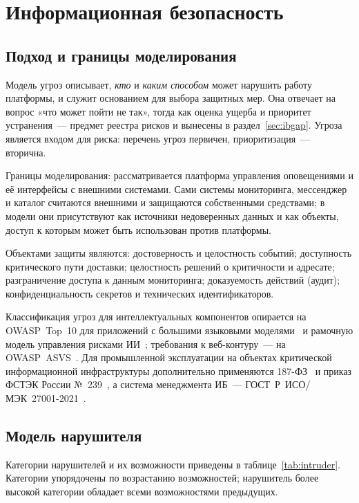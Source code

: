 \documentclass[utf8x, 12pt]{G7-32} %
\begin{document}
\chapter{Информационная безопасность}

\section{Подход и границы моделирования}
Модель угроз описывает, \emph{кто} и \emph{каким способом} может нарушить
работу платформы, и служит основанием для выбора защитных мер. Она отвечает на
вопрос «что может пойти не так», тогда как оценка ущерба и приоритет
устранения~--- предмет реестра рисков и вынесены в
раздел~\ref{sec:ibgap}. Угроза является входом для риска: перечень угроз
первичен, приоритизация~--- вторична.

Границы моделирования: рассматривается платформа управления оповещениями и её
интерфейсы с внешними системами. Сами системы мониторинга, мессенджер и
каталог считаются внешними и защищаются собственными средствами; в модели они
присутствуют как источники недоверенных данных и как объекты, доступ к которым
может быть использован против платформы.

Объектами защиты являются: достоверность и целостность событий; доступность
критического пути доставки; целостность решений о критичности и адресате;
разграничение доступа к данным мониторинга; доказуемость действий (аудит);
конфиденциальность секретов и технических идентификаторов.

Классификация угроз для интеллектуальных компонентов опирается на
OWASP~Top~10 для приложений с большими языковыми
моделями~\cite{owaspllm2025} и рамочную модель управления рисками
ИИ~\cite{nistairmf}; требования к веб-контуру~--- на
OWASP~ASVS~\cite{owaspasvs}. Для промышленной эксплуатации на объектах
критической информационной инфраструктуры дополнительно применяются
187-ФЗ~\cite{fz187} и приказ ФСТЭК России №~239~\cite{fstek239}, а система
менеджмента ИБ~--- ГОСТ~Р~ИСО/МЭК~27001-2021~\cite{gost27001}.

\section{Модель нарушителя}
Категории нарушителей и их возможности приведены в
таблице~\ref{tab:intruder}. Категории упорядочены по возрастанию возможностей;
нарушитель более высокой категории обладает всеми возможностями предыдущих.
\end{document}
